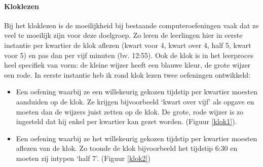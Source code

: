 \documentclass[a4paper,11pt]{article}
\theoremstyle{definition}
\begin{document}
\paragraph{Kloklezen}
\noindent Bij het kloklezen is de moeilijkheid bij bestaande computeroefeningen vaak dat 
ze veel te moeilijk zijn voor deze doelgroep. Zo leren de leerlingen hier in eerste instantie per 
kwartier de klok aflezen (kwart voor 4, kwart over 4, half 5, kwart voor 5) en 
pas dan per vijf minuten (bv. 12:55). Ook de klok is in het leerproces heel specifiek  
van vorm: de kleine wijzer heeft een blauwe kleur, de grote wijzer een rode. In 
eerste instantie heb ik rond klok lezen twee oefeningen ontwikkeld:
\begin{itemize}
  \item Een oefening waarbij ze een willekeurig gekozen tijdstip per kwartier moesten aanduiden op 
  de klok. Ze krijgen bijvoorbeeld `kwart over vijf' als opgave en moeten dan 
 de wijzers juist zetten op de klok. De grote, rode wijzer is zo ingesteld dat 
 hij enkel per kwartier kan gezet worden. (Figuur \ref{klok1}).
 \item Een oefening waarbij ze het willekeurig gekozen tijdstip per kwartier moesten aflezen van de 
 klok. Zo toonde de klok bijvoorbeeld het tijdstip 6:30 en moeten zij intypen 
 `half 7'. (Figuur \ref{klok2})
\end{itemize}
\end{document}
